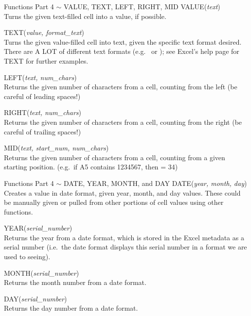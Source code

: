 \documentclass{beamer}
\newcommand{\fsig}[2]{{\color{red!75!black}\large\textsf{#1(\textit{#2})}}}
\begin{document}
\begin{frame}{Functions Part 4 $\sim$ VALUE, TEXT, LEFT, RIGHT, MID}
\small
\fsig{VALUE}{text}\\
Turns the given text-filled cell into a value, if possible.

\vspace{0.4em}
\fsig{TEXT}{value, format\_text}\\
Turns the given value-filled cell into text, given the specific text format desired. There
are A LOT of different text formats (e.g.\  or ); see
Excel's help page for TEXT for further examples.

\vspace{0.4em}
\fsig{LEFT}{text, num\_chars}\\
Returns the given number of characters from a cell, counting from the left (be careful of
leading spaces!)

\vspace{0.4em}
\fsig{RIGHT}{text, num\_chars}\\
Returns the given number of characters from a cell, counting from the right (be careful
of trailing spaces!)

\vspace{0.4em}
\fsig{MID}{text, start\_num, num\_chars}\\
Returns the given number of characters from a cell, counting from a given starting
position. (e.g.\ if A5 contains 1234567, then  = 34)
\end{frame}

\begin{frame}{Functions Part 4 $\sim$ DATE, YEAR, MONTH, and DAY}
\fsig{DATE}{year, month, day}\\
Creates a value in date format, given year, month, and day values. These could be
manually given or pulled from other portions of cell values using other functions.

\vspace{0.6em}
\fsig{YEAR}{serial\_number}\\
Returns the year from a date format, which is stored in the Excel metadata as a serial
number (i.e.\ the date format displays this serial number in a format we are used to
seeing).

\vspace{0.6em}
\fsig{MONTH}{serial\_number}\\
Returns the month number from a date format.

\vspace{0.6em}
\fsig{DAY}{serial\_number}\\
Returns the day number from a date format.
\end{frame}
\end{document}
